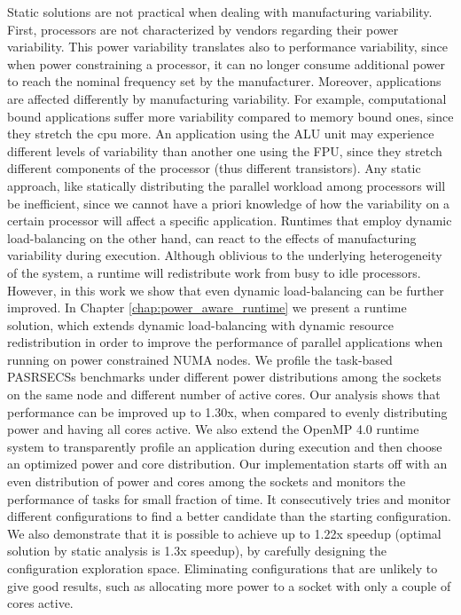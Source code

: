 Static solutions are not practical when dealing with manufacturing variability.  First,
processors are not characterized by vendors regarding their power variability.  This power
variability translates also to performance variability, since when power constraining a
processor, it can no longer consume additional power to reach the nominal frequency set by
the manufacturer.  Moreover, applications are affected differently by manufacturing
variability.  For example, computational bound applications suffer more variability
compared to memory bound ones, since they stretch the cpu more.  An application using the
ALU unit may experience different levels of variability than another one using the FPU,
since they stretch different components of the processor (thus different transistors).
Any static approach, like statically distributing the parallel workload among processors
will be inefficient, since we cannot have a priori knowledge of how the variability on a
certain processor will affect a specific application.  Runtimes that employ dynamic
load-balancing on the other hand, can react to the effects of manufacturing variability
during execution. Although oblivious to the underlying heterogeneity of the system, a
runtime will redistribute work from busy to idle processors.  However, in this work we
show that even dynamic load-balancing can be further improved.  In Chapter
\ref{chap:power_aware_runtime} we present a runtime solution, which extends dynamic
load-balancing with dynamic resource redistribution in order to improve the performance of
parallel applications when running on power constrained NUMA nodes. We profile the
task-based PASRSECSs benchmarks under different power distributions among the sockets on
the same node and different number of active cores.  Our analysis shows that performance
can be improved up to 1.30x, when compared to evenly distributing power and having all
cores active.  We also extend the OpenMP 4.0 runtime system to transparently profile an
application during execution and then choose an optimized power and core distribution.
Our implementation starts off with an even distribution of power and cores among the
sockets and monitors the performance of tasks for small fraction of time.  It
consecutively tries and monitor different configurations to find a better candidate than
the starting configuration.  We also demonstrate that it is possible to achieve up to
1.22x speedup (optimal solution by static analysis is 1.3x speedup), by carefully
designing the configuration exploration space.  Eliminating configurations that are
unlikely to give good results, such as allocating more power to a socket with only a
couple of cores active.

